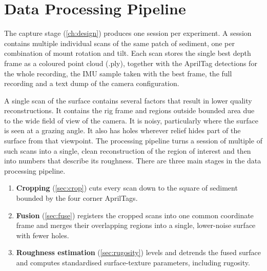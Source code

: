 \chapter{Data Processing Pipeline}
\label{ch:Pipeline}

The capture stage (\autoref{ch:design}) produces one session per experiment. A session contains multiple individual scans of the same patch of sediment, one per combination of mount rotation and tilt. Each scan stores the single best depth frame as a coloured point cloud (.ply), together with the AprilTag detections for the whole recording, the IMU sample taken with the best frame, the full recording and a text dump of the camera configuration.

A single scan of the surface contains several factors that result in lower quality reconstructions. It contains the rig frame and regions outside bounded area due to the wide field of view of the camera. It is noisy, particularly where the surface is seen at a grazing angle. It also has holes wherever relief hides part of the surface from that viewpoint. The processing pipeline turns a session of multiple of such scans into a single, clean reconstruction of the region of interest and then into numbers that describe its roughness. There are three main stages in the data processing pipeline.

\begin{enumerate}
	\item \textbf{Cropping} (\autoref{sec:crop}) cuts every scan down to the square of sediment bounded by the four corner AprilTags.
	
	\item \textbf{Fusion} (\autoref{sec:fuse}) registers the cropped scans into one common coordinate frame and merges their overlapping regions into a single, lower-noise surface with fewer holes.
	
	\item \textbf{Roughness estimation} (\autoref{sec:rugosity}) levels and detrends the fused surface and computes standardised surface-texture parameters, including rugosity.
	
\end{enumerate}

